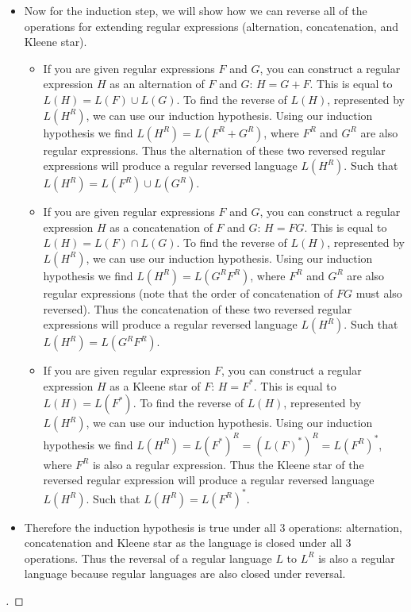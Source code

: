 \documentclass[12pt]{article}
\newenvironment{solution}[1][{\color{red} Solution:}]{\begin{trivlist}
\item[\hskip \labelsep {\bfseries #1}\hskip \labelsep {\bfseries}]}{\end{trivlist}}
\begin{document}
\begin{solution}
\begin{itemize}[label=]
\item Now for the induction step, we will show how we can reverse  all of the operations for extending regular expressions (alternation, concatenation, and Kleene star). 
     \begin{itemize}[label=]
        \item If you are given regular expressions $F$ and  $G$, you can construct a regular expression $H$ as an alternation of $F$ and $G$: $H = G + F$. This is equal to $L(H) = L(F) \cup L(G)$. To find the reverse of $L(H)$, represented by $L(H^R)$, we can use our induction hypothesis. Using our induction hypothesis we find $L(H^R) = L(F^R + G^R)$, where $F^R$ and $G^R$ are also regular expressions. Thus the alternation of these two reversed regular expressions will produce a regular reversed language $L(H^R)$. Such that $L(H^R) = L(F^R) \cup L(G^R)$. 
        \end{itemize}

        \begin{itemize}[label=]
        \item If you are given regular expressions $F$ and  $G$, you can construct a regular expression $H$ as a concatenation of $F$ and $G$: $H = FG$. This is equal to $L(H) = L(F) \cap L(G)$. To find the reverse of $L(H)$, represented by $L(H^R)$, we can use our induction hypothesis. Using our induction hypothesis we find $L(H^R) = L(G^RF^R)$, where $F^R$ and $G^R$ are also regular expressions (note that the order of concatenation of $FG$ must also reversed). Thus the concatenation of these two reversed regular expressions will produce a regular reversed language $L(H^R)$. Such that $L(H^R) = L(G^RF^R)$.
        \end{itemize}

        \begin{itemize}[label=]
        \item If you are given regular expression $F$, you can construct a regular expression $H$ as a Kleene star of $F$: $H = F^*$. This is equal to $L(H) = L(F^*)$. To find the reverse of $L(H)$, represented by $L(H^R)$, we can use our induction hypothesis. Using our induction hypothesis we find $L(H^R) = L(F^*)^R = (L(F)^*)^R = L(F^R)^*$, where $F^R$ is also a regular expression. Thus the Kleene star of the reversed regular expression will produce a regular reversed language $L(H^R)$. Such that $L(H^R) = L(F^R)^*$.
        \end{itemize}

\item Therefore the induction hypothesis is true under all 3 operations: alternation, concatenation and Kleene star as the language is closed under all 3 operations.  Thus  the reversal of a regular language $L$ to $L^R$ is also a regular language because regular languages are also closed under reversal. 

     \end{itemize}
\begin{proof}[\unskip\nopunct]
   \qedhere
\end{proof}   
\end{solution}
\end{document}
